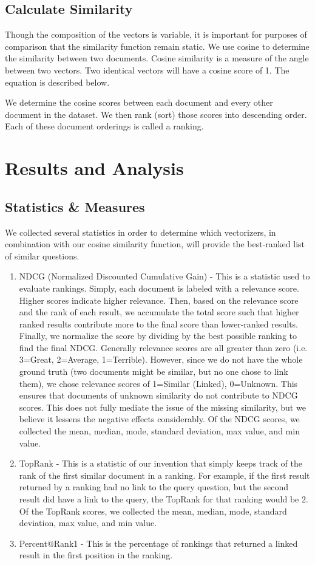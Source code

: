 \documentclass{acm_proc_article-sp}
\begin{document}
\subsection{Calculate Similarity}
Though the composition of the vectors is variable, it is important for purposes of comparison that the similarity function remain static. We use cosine to determine the similarity between two documents. Cosine similarity is a measure of the angle between two vectors. Two identical vectors will have a cosine score of 1. The equation is described below.

We determine the cosine scores between each document and every other document in the dataset. We then rank (sort) those scores into descending order. Each of these document orderings is called a ranking. 

\section{Results and Analysis}
\subsection{Statistics \& Measures}
We collected several statistics in order to determine which vectorizers, in combination with our cosine similarity function, will provide the best-ranked list of similar questions. 
\begin{enumerate}[noitemsep]
	\item NDCG (Normalized Discounted Cumulative Gain) - This is a statistic used to evaluate rankings. Simply, each document is labeled with a relevance score. Higher scores indicate higher relevance. Then, based on the relevance score and the rank of each result, we accumulate the total score such that higher ranked results contribute more to the final score than lower-ranked results. Finally, we normalize the score by dividing by the best possible ranking to find the final NDCG. 
Generally relevance scores are all greater than zero (i.e. 3=Great, 2=Average, 1=Terrible). However, since we do not have the whole ground truth (two documents might be similar, but no one chose to link them), we chose relevance scores of 1=Similar (Linked), 0=Unknown. This ensures that documents of unknown similarity do not contribute to NDCG scores. This does not fully mediate the issue of the missing similarity, but we believe it lessens the negative effects considerably.
Of the NDCG scores, we collected the mean, median, mode, standard deviation, max value, and min value.
	\item TopRank - This is a statistic of our invention that simply keeps track of the rank of the first similar document in a ranking. For example, if the first result returned by a ranking had no link to the query question, but the second result did have a link to the query, the TopRank for that ranking would be 2. Of the TopRank scores, we collected the mean, median, mode, standard deviation, max value, and min value.
	\item Percent@Rank1 - This is the percentage of rankings that returned a linked result in the first position in the ranking.
\end{enumerate}
\end{document}
